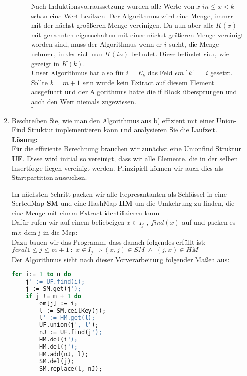 \documentclass[11pt,a4paper,ngerman]{article}
\begin{document}
\begin{enumerate}[\bfseries a)]
\begin{description}
Nach Induktionsvorraussetzung wurden alle Werte von $x \; in \leq x < k$ schon eine Wert besitzen. Der Algorithmus wird eine Menge, immer mit der nächst groößeren Menge vereinigen. Da nun aber alle $K(x)$ mit genannten eigenschaften mit einer nächst größeren Menge vereinigt worden sind, muss der Algorithmus wenn er $i$ sucht, die Menge nehmen, in der sich nun $K(in)$ befindet. Diese befindet sich, wie gezeigt in $K(k)$.\\

Unser Algorithmus hat also für $i = E_k$ das Feld $em[k] = i$ gesetzt. Sollte $k=m+1$ sein wurde kein Extract auf diesem Element ausgeführt und der Algorithmus hätte die if Block übersprungen und auch den Wert niemals zugewiesen.\\
\mbox{}\hfill $\square$

\end{description}

\item Beschreiben Sie, wie man den Algorithmus aus b) effizient mit einer Union-Find Struktur implementieren kann und analysieren Sie die Laufzeit.\\

\textbf{Lösung:}\\
Für die effiziente Berechnung brauchen wir zunächst eine Unionfind Struktur \textbf{UF}. Diese wird initial so vereinigt, dass wir alle Elemente, die in der selben Insertfolge liegen vereinigt werden. Prinzipiell können wir auch dies als Startpartition aussuchen.\\

\pagebreak

Im nächsten Schritt packen wir alle Represantanten als Schlüssel in eine SortedMap \textbf{SM} und eine HashMap \textbf{HM} um die Umkehrung zu finden, die eine Menge mit einem Extract identifizieren kann.\\
Dafür rufen wir auf einem beliebeigen $x \in I_j$ , $find(x)$ auf und packen es mit dem j in die Map:\\
Dazu bauen wir das Programm, dass danach folgendes erfüllt ist:\\
$foral 1 \leq j \leq m+1 \; : \; x \in I_j \Rightarrow (x,j)\in SM \; \land \; (j,x) \in HM$\\

Der Algorithmus sieht nach dieser Vorverarbeitung folgender Maßen aus:\\
\begin{lstlisting}[language=Pascal]
for i:= 1 to n do
	j' := UF.find(i);
	j := SM.get(j');
	if j != m + 1 do
		em[j] := i;
		l := SM.ceilKey(j);
		l' := HM.get(l);
		UF.union(j', l');
		nJ := UF.find(j');
		HM.del(i');
		HM.del(j');
		HM.add(nJ, l);
		SM.del(j);
		SM.replace(l, nJ);
\end{lstlisting}


\end{enumerate}
\end{document}
